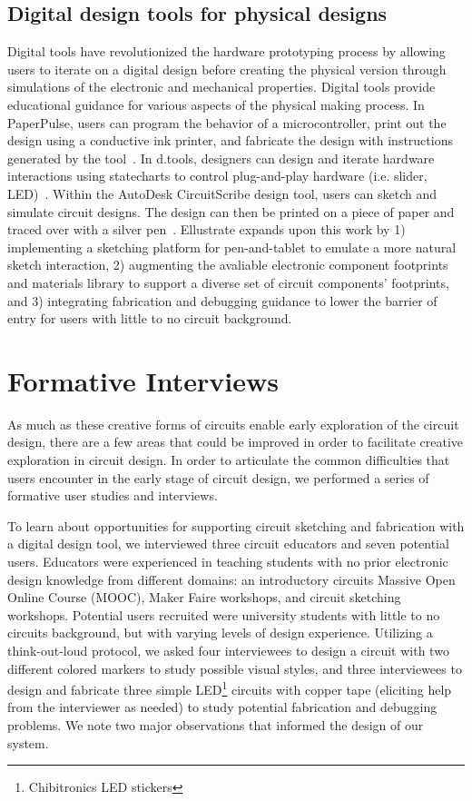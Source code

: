 \documentclass{sigchi}
\begin{document}
\subsection{Digital design tools for physical designs}
Digital tools have revolutionized the hardware prototyping process by allowing users to iterate on a digital design before creating the physical version through simulations of the electronic and mechanical properties. Digital tools provide educational guidance for various aspects of the physical making process. In PaperPulse, users can program the behavior of a microcontroller, print out the design using a conductive ink printer, and fabricate the design with instructions generated by the tool~\cite{RafRamakers:2015gb}. In d.tools, designers can design and iterate hardware interactions using statecharts to control plug-and-play hardware (i.e. slider, LED)~\cite{hartmann_reflective_2006}. Within the AutoDesk CircuitScribe design tool, users can sketch and simulate circuit designs. The design can then be printed on a piece of paper and traced over with a silver pen~\cite{_autodesk_2016}. Ellustrate expands upon this work by 1) implementing a sketching platform for pen-and-tablet to emulate a more natural sketch interaction, 2) augmenting the avaliable electronic component footprints and materials library to support a diverse set of circuit components' footprints, and 3) integrating fabrication and debugging guidance to lower the barrier of entry for users with little to no circuit background.


\section{Formative Interviews}
As much as these creative forms of circuits enable early exploration of the circuit design, there are a few areas that could be improved in order to facilitate creative exploration in circuit design. In order to articulate the common difficulties that users encounter in the early stage of circuit design, we performed a series of formative user studies and interviews. 

To learn about opportunities for supporting circuit sketching and fabrication with a digital design tool, we interviewed three circuit educators and seven potential users. 
Educators were experienced in teaching students with no prior electronic design knowledge from different domains: an introductory circuits Massive Open Online Course (MOOC), Maker Faire workshops, and circuit sketching workshops. 
Potential users recruited were university students with little to no circuits background, but with varying levels of design experience. Utilizing a think-out-loud protocol, we asked four interviewees to design a circuit with two different colored markers to study possible visual styles, and three interviewees to design and fabricate three simple  LED\footnote{Chibitronics LED stickers} circuits with copper tape (eliciting help from the interviewer as needed) to study potential fabrication and debugging problems. We note two major observations that informed the design of our system.
\end{document}
